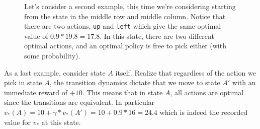 \documentclass[12pt]{article}
\begin{document}
\begin{figure}[h]
  \centering
  \caption{\footnotesize Let's consider a second example, this time we're considering starting from the state in the middle row and middle column. Notice that there are two actions, \texttt{up} and \texttt{left} which give the same optimal value of $0.9 * 19.8 = 17.8$. In this state, there are two different optimal actions, and an optimal policy is free to pick either (with some probability).}
\end{figure}

As a last example, consider state $A$ itself. Realize that regardless of the action we pick in state $A$, the transition dynamics dictate that we move to state $A'$ with an immediate reward of $+10$. This means that in state $A$, all actions are optimal since the transitions are equivalent. In particular $v_*(A) = 10 + \gamma * v_*(A') = 10 + 0.9 * 16 = 24.4$ which is indeed the recorded value for $v_*$ at this state.
\end{document}

